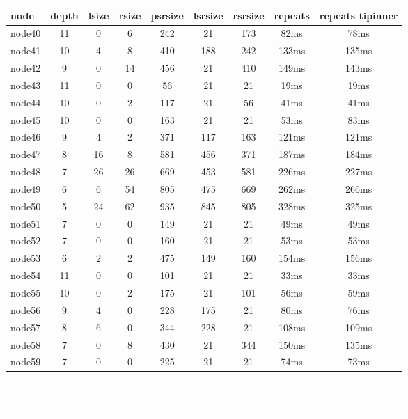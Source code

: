 \begin{tabular}{|l|c|c|c|c|c|c|c|c|}
\hline node & depth & lsize & rsize & psrsize & lsrsize & rsrsize   & repeats & repeats tipinner\\
    \hline node40 & 11 & 0 & 6 & 242 & 21 & 173 & 82ms & 78ms\\
    \hline node41 & 10 & 4 & 8 & 410 & 188 & 242 & 133ms & 135ms\\
    \hline node42 & 9 & 0 & 14 & 456 & 21 & 410 & 149ms & 143ms\\
    \hline node43 & 11 & 0 & 0 & 56 & 21 & 21 & 19ms & 19ms\\
    \hline node44 & 10 & 0 & 2 & 117 & 21 & 56 & 41ms & 41ms\\
    \hline node45 & 10 & 0 & 0 & 163 & 21 & 21 & 53ms & 83ms\\
    \hline node46 & 9 & 4 & 2 & 371 & 117 & 163 & 121ms & 121ms\\
    \hline node47 & 8 & 16 & 8 & 581 & 456 & 371 & 187ms & 184ms\\
    \hline node48 & 7 & 26 & 26 & 669 & 453 & 581 & 226ms & 227ms\\
    \hline node49 & 6 & 6 & 54 & 805 & 475 & 669 & 262ms & 266ms\\
    \hline node50 & 5 & 24 & 62 & 935 & 845 & 805 & 328ms & 325ms\\
    \hline node51 & 7 & 0 & 0 & 149 & 21 & 21 & 49ms & 49ms\\
    \hline node52 & 7 & 0 & 0 & 160 & 21 & 21 & 53ms & 53ms\\
    \hline node53 & 6 & 2 & 2 & 475 & 149 & 160 & 154ms & 156ms\\
    \hline node54 & 11 & 0 & 0 & 101 & 21 & 21 & 33ms & 33ms\\
    \hline node55 & 10 & 0 & 2 & 175 & 21 & 101 & 56ms & 59ms\\
    \hline node56 & 9 & 4 & 0 & 228 & 175 & 21 & 80ms & 76ms\\
    \hline node57 & 8 & 6 & 0 & 344 & 228 & 21 & 108ms & 109ms\\
    \hline node58 & 7 & 0 & 8 & 430 & 21 & 344 & 150ms & 135ms\\
    \hline node59 & 7 & 0 & 0 & 225 & 21 & 21 & 74ms & 73ms\\

\hline
\end{tabular} \

---


